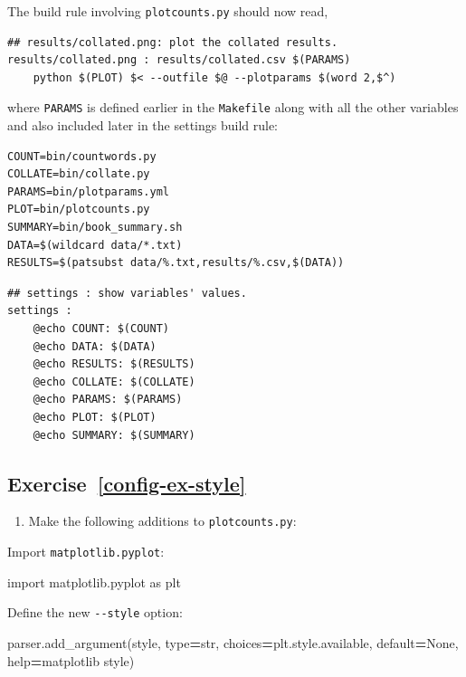 \documentclass[
]{krantz}
\makeatletter
\newenvironment{Shaded}{\begin{snugshade}}{\end{snugshade}}
\newcommand{\BuiltInTok}[1]{#1}
\newcommand{\ImportTok}[1]{#1}
\newcommand{\NormalTok}[1]{#1}
\newcommand{\OperatorTok}[1]{\textcolor[rgb]{0.81,0.36,0.00}{\textbf{#1}}}
\newcommand{\StringTok}[1]{\textcolor[rgb]{0.31,0.60,0.02}{#1}}
\newcommand{\VariableTok}[1]{\textcolor[rgb]{0.00,0.00,0.00}{#1}}
\providecommand{\tightlist}{%
  \setlength{\itemsep}{0pt}\setlength{\parskip}{0pt}}
\newenvironment{kframe}{%
\medskip{}
\setlength{\fboxsep}{.8em}
 \def\at@end@of@kframe{}%
 \ifinner\ifhmode%
  \def\at@end@of@kframe{\end{minipage}}%
  \begin{minipage}{\columnwidth}%
 \fi\fi%
 \def\FrameCommand##1{\hskip\@totalleftmargin \hskip-\fboxsep
 \colorbox{shadecolor}{##1}\hskip-\fboxsep
     \hskip-\linewidth \hskip-\@totalleftmargin \hskip\columnwidth}%
 \MakeFramed {\advance\hsize-\width
   \@totalleftmargin\z@ \linewidth\hsize
   \@setminipage}}%
 {\par\unskip\endMakeFramed%
 \at@end@of@kframe}
\renewenvironment{Shaded}{\begin{kframe}}{\end{kframe}}
\makeatother
\begin{document}
The build rule involving \texttt{plotcounts.py} should now read,

\begin{verbatim}
## results/collated.png: plot the collated results.
results/collated.png : results/collated.csv $(PARAMS)
    python $(PLOT) $< --outfile $@ --plotparams $(word 2,$^)
\end{verbatim}

where \texttt{PARAMS} is defined earlier in the \texttt{Makefile}
along with all the other variables and
also included later in the settings build rule:

\begin{verbatim}
COUNT=bin/countwords.py
COLLATE=bin/collate.py
PARAMS=bin/plotparams.yml
PLOT=bin/plotcounts.py
SUMMARY=bin/book_summary.sh
DATA=$(wildcard data/*.txt)
RESULTS=$(patsubst data/%.txt,results/%.csv,$(DATA))
\end{verbatim}

\begin{verbatim}
## settings : show variables' values.
settings :
    @echo COUNT: $(COUNT)
    @echo DATA: $(DATA)
    @echo RESULTS: $(RESULTS)
    @echo COLLATE: $(COLLATE)
    @echo PARAMS: $(PARAMS)
    @echo PLOT: $(PLOT)
    @echo SUMMARY: $(SUMMARY)
\end{verbatim}

\hypertarget{exercise-refconfig-ex-style}{%
\subsection*{Exercise~\ref{config-ex-style}}\label{exercise-refconfig-ex-style}}


\begin{enumerate}
\def\labelenumi{\arabic{enumi}.}
\tightlist
\item
  Make the following additions to \texttt{plotcounts.py}:
\end{enumerate}

Import \texttt{matplotlib.pyplot}:

\begin{Shaded}
\begin{Highlighting}[]
\ImportTok{import}\NormalTok{ matplotlib.pyplot }\ImportTok{as}\NormalTok{ plt}
\end{Highlighting}
\end{Shaded}

Define the new \texttt{-\/-style} option:

\begin{Shaded}
\begin{Highlighting}[]
\NormalTok{parser.add\_argument(}\StringTok{\textquotesingle{}{-}{-}style\textquotesingle{}}\NormalTok{, }\BuiltInTok{type}\OperatorTok{=}\BuiltInTok{str}\NormalTok{, choices}\OperatorTok{=}\NormalTok{plt.style.available,}
\NormalTok{                    default}\OperatorTok{=}\VariableTok{None}\NormalTok{, }\BuiltInTok{help}\OperatorTok{=}\StringTok{\textquotesingle{}matplotlib style\textquotesingle{}}\NormalTok{)}
\end{Highlighting}
\end{Shaded}
\end{document}
